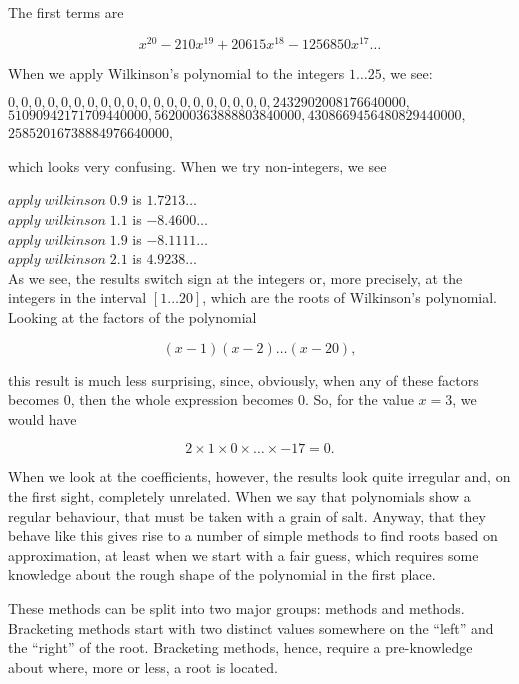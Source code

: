 \documentclass[tikz]{scrreprt}
\newcommand{\Varid}[1]{\mathit{#1}}
\begin{document}
The first terms are

\[
x^{20} - 210x^{19} + 20615x^{18} - 1256850x^{17} \dots
\]

When we apply Wilkinson's polynomial to the integers $1\dots 25$, we see:

\ensuremath{\mathrm{0},\mathrm{0},\mathrm{0},\mathrm{0},\mathrm{0},\mathrm{0},\mathrm{0},\mathrm{0},\mathrm{0},\mathrm{0},\mathrm{0},\mathrm{0},\mathrm{0},\mathrm{0},\mathrm{0},\mathrm{0},\mathrm{0},\mathrm{0},\mathrm{0},\mathrm{0},\mathrm{2432902008176640000},}\\
\ensuremath{\mathrm{51090942171709440000},\mathrm{562000363888803840000},\mathrm{4308669456480829440000},}\\
\ensuremath{\mathrm{25852016738884976640000}},

which looks very confusing. When we try non-integers, we see

\ensuremath{\Varid{apply}\;\Varid{wilkinson}\;\mathrm{0.9}} is $1.7213\dots$\\
\ensuremath{\Varid{apply}\;\Varid{wilkinson}\;\mathrm{1.1}} is $-8.4600\dots$\\
\ensuremath{\Varid{apply}\;\Varid{wilkinson}\;\mathrm{1.9}} is $-8.1111\dots$\\
\ensuremath{\Varid{apply}\;\Varid{wilkinson}\;\mathrm{2.1}} is $4.9238\dots$\\

As we see, the results switch sign at the integers or,
more precisely, at the integers in the interval $[1\dots 20]$,
which are the roots of Wilkinson's polynomial.
Looking at the factors of the polynomial

\[
(x-1)(x-2)\dots (x-20),
\]

this result is much less surprising, since, obviously,
when any of these factors becomes 0, then the whole
expression becomes 0. So, for the value $x=3$, we would have

\[
2 \times 1 \times 0 \times \dots \times -17 = 0.
\]

When we look at the coefficients, however,
the results
look quite irregular and, on the first sight,
completely unrelated.
When we say that polynomials show a regular behaviour,
that must be taken with a grain of salt.
Anyway, that they behave like this 
gives rise to a number of simple
methods to find roots based on approximation,
at least when we start with a fair guess,
which requires some knowledge about the rough shape
of the polynomial in the first place.

These methods can be split into two major groups:
 methods and  methods.
Bracketing methods start with two distinct values
somewhere on the ``left'' and the ``right'' of
the root. Bracketing methods, hence, require a
pre-knowledge about where, more or less, a root
is located. 
\end{document}
